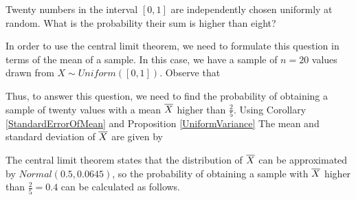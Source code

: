 \begin{examp}\label{CLTExamp}Twenty numbers in the interval $[0,1]$ are independently chosen uniformly at random. What is the probability their sum is higher than eight?
\par
\noindent In order to use the central limit theorem, we need to formulate this question in terms of the mean of a sample. In this case, we have a sample of $n=20$ values drawn from $X \sim Uniform([0,1])$. Observe that
\par
\noindent Thus, to answer this question, we need to find the probability of obtaining a sample of twenty values with a mean ${\overline{X}}$ higher than $\frac{2}{5}$. Using Corollary \ref{StandardErrorOfMean} and Proposition \ref{UniformVariance} The mean and standard deviation of ${\overline{X}}$ are given by
\par
\noindent The central limit theorem states that the distribution of ${\overline{X}}$ can be approximated by $Normal(0.5, 0.0645)$, so the probability of obtaining a sample with ${\overline{X}}$ higher than $\frac{2}{5} = 0.4$ can be calculated as follows.



\end{examp}

